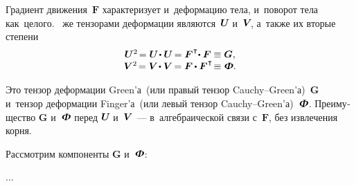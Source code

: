 
\label{para:deformationtensors}

\begin{otherlanguage}{russian}

Градиент движения~$\bm{F}$ характеризует и~деформацию тела, и~поворот тела как~целого. ~же тензорами деформации являются~${\bm{U}\hspace{-0.25ex}}$ и~${\bm{V}\hspace{-0.4ex}}$, а~также их вторые степени
\nopagebreak\vspace{.12em}\begin{equation}\label{deformationmeasures}
\begin{array}{c}
\bm{U}^2 \hspace{-0.32ex} = \bm{U} \hspace{-0.32ex} \dotp \bm{U} \hspace{-0.25ex} = \bm{F}^{\hspace{.1ex}\T} \hspace{-0.5ex} \dotp \bm{F} \equiv \bm{G} , \\[.1ex]
\bm{V}^2 \hspace{-0.32ex} = \bm{V} \hspace{-0.32ex} \dotp \bm{V} \hspace{-0.25ex} = \bm{F} \hspace{-0.1ex} \dotp \bm{F}^{\hspace{.1ex}\T} \hspace{-0.36ex} \equiv \mathboldPhi .
\end{array}
\end{equation}

\vspace{-0.25em} \noindent Это тензор деформации Green’а~(или правый тензор Cauchy--Green’а)~$\bm{G}$ и~тензор деформации Finger’а~(или левый тензор Cauchy--Green’а)~$\mathboldPhi$. Пре\-иму\-щест\-во $\bm{G}$ и~$\mathboldPhi$ перед ${\bm{U}\hspace{-0.25ex}}$ и~${\bm{V}\hspace{-0.25ex}}$~--- в~алгебраической связи с~$\bm{F}$, без извлечения корня.

Рассмотрим компоненты $\bm{G}$ и~$\mathboldPhi$:


...

\vspace{1cm}


\end{otherlanguage}
